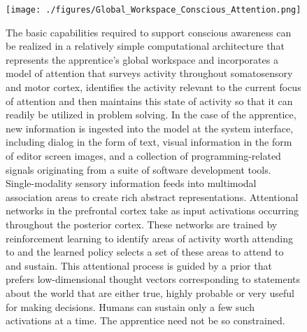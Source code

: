 \begin{figure}
%
  \begin{center} 
    \texttt{[image: ./figures/Global\_Workspace\_Conscious\_Attention.png]} %
  \end{center}
%
  \caption{The basic capabilities required to support conscious awareness can be realized in a relatively simple computational architecture that represents the apprentice's global workspace and incorporates a model of attention that surveys activity throughout somatosensory and motor cortex, identifies the activity relevant to the current focus of attention and then maintains this state of activity so that it can readily be utilized in problem solving.  In the case of the apprentice, new information is ingested into the model at the system interface, including dialog in the form of text, visual information in the form of editor screen images, and a collection of programming-related signals originating from a suite of software development tools. 
%
Single-modality sensory information feeds into multimodal association areas to create rich abstract representations. Attentional networks in the prefrontal cortex take as input activations occurring throughout the posterior cortex. These networks are trained by reinforcement learning to identify areas of activity worth attending to and the learned policy selects a set of these areas to attend to and sustain. This attentional process is guided by a prior that prefers low-dimensional thought vectors corresponding to statements about the world that are either true, highly probable or very useful for making decisions. Humans can sustain only a few such activations at a time. The apprentice need not be so constrained.}
%
  \label{fig_conscious}
%
\end{figure}



